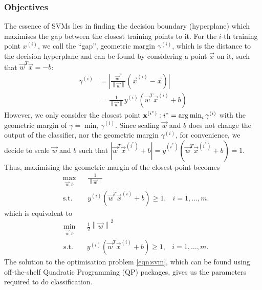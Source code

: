 \subsubsection{Objectives}
	The essence of SVMs lies in finding the decision boundary (hyperplane) which maximises the gap between the closest training points to it. For the $i$-th training point $x^{(i)}$, we call the ``gap'', geometric margin $\gamma^{(i)}$, which is the distance to the decision hyperplane and can be found by considering a point $\vec{x}$ on it, such that $\vec{w}^T\vec{x} = -b$:
	\begin{align*}
		\gamma^{(i)} 	&= \left| \frac{\vec{w}^T}{\left\| \vec{w} \right\|} \left( \vec{x}^{(i)} - \vec{x} \right) \right| \\
					&= \frac{1}{\left\| \vec{w} \right\|} y^{(i)} \left( \vec{w}^T \vec{x}^{(i)} + b \right)
	\end{align*}
However, we only consider the closest point $\boldsymbol{\mathbf{x}}^{\left( i^\ast \right)} : i^\ast = \operatorname*{arg\,min}_i{\gamma^{(i)}}$ with the geometric margin of $\gamma = \min_{i}{\gamma^{(i)}}$. Since scaling $\vec{w}$ and $b$ does not change the output of the classifier, nor the geometric margin $\gamma^{(i)}$, for convenience, we decide to scale $\vec{w}$ and $b$ such that $\left| \vec{w}^T \vec{x}^{(i^\ast)} + b \right| = y^{(i^\ast)} \left( \vec{w}^T \vec{x}^{(i^\ast)} + b \right) = 1$. Thus, maximising the geometric margin of the closest point becomes
	\begin{equation*}
	\begin{aligned}
		&\max_{\vec{w}, b} 		& & \frac{1}{\left\| \vec{w} \right\|} \\
		&\text{s.t.}				& & y^{(i)}(\vec{w}^T\vec{x}^{(i)} + b) \geq 1, &i=1,\dotsc,m.
	\end{aligned}
	\end{equation*}
which is equivalent to
	\begin{equation}
	\begin{aligned}
		&\min_{\vec{w}, b} 	& & \frac{1}{2} \left\| \vec{w} \right\|^2 \\
		&\text{s.t.}				& & y^{(i)}(\vec{w}^T\vec{x}^{(i)} + b) \geq 1, &i=1,\dotsc,m.
	\end{aligned}
	\label{eqn:svm}
	\end{equation}
The solution to the optimisation problem \eqref{eqn:svm}, which can be found using off-the-shelf Quadratic Programming (QP) packages, gives us the parameters required to do classification.

